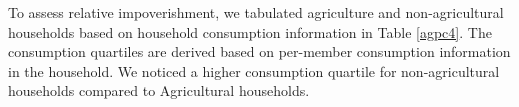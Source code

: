 \documentclass[12pt,letterpaper]{article}
\newcommand{\SAdded}[1]{\textcolor{red}{#1}}
\newcommand{\0}{\ensuremath{\mbox{\boldmath $0$}}}
\begin{document}





To assess relative impoverishment, we tabulated agriculture and non-agricultural households based on household consumption information in Table \ref{agpc4}. The consumption quartiles are derived based on per-member consumption information in the household. We noticed a higher consumption quartile for non-agricultural households compared to Agricultural households.
\end{document}
